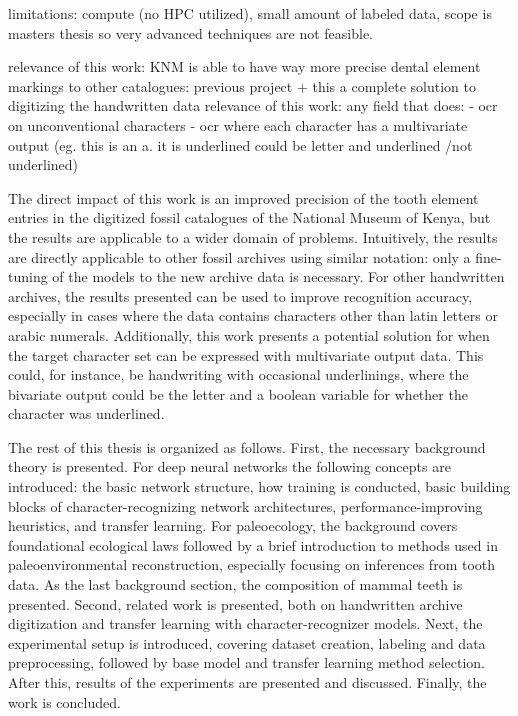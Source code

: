 \documentclass{article}
\begin{document}

limitations: compute (no HPC utilized), small amount of labeled data, scope is masters thesis so very advanced techniques are not feasible.

relevance of this work: KNM is able to have way more precise dental element markings
to other catalogues: previous project + this a complete solution to digitizing the handwritten data 
relevance of this work: any field that does:
- ocr on unconventional characters
- ocr where each character has a multivariate output (eg. this is an a. it is underlined could be letter and underlined /not underlined)

The direct impact of this work is an improved precision of the tooth element entries in the digitized 
fossil catalogues of the National Museum of Kenya, but the results are applicable to a wider domain of problems.
Intuitively, the results are directly applicable to other fossil archives using similar notation: only a fine-tuning of the 
models to the new archive data is necessary.
For other handwritten archives, the results presented can be used to improve recognition accuracy, especially in cases 
where the data contains characters other than latin letters or arabic numerals. Additionally, this work presents
a potential solution for when the target character set can be expressed with multivariate output data. This could, for 
instance, be handwriting with occasional underlinings, where the bivariate output could be the letter and a boolean variable for 
whether the character was underlined.

The rest of this thesis is organized as follows. First, the necessary background theory is 
presented. For deep neural networks the following concepts are introduced:
the basic network structure, how training is conducted, basic building blocks of character-recognizing network architectures, performance-improving 
heuristics, and transfer learning. For paleoecology, the background covers 
foundational ecological laws followed by a brief introduction to methods used in
paleoenvironmental reconstruction, especially focusing on inferences from tooth data.
As the last background section, the composition of mammal teeth is presented. 
Second, related work is presented, both on
handwritten archive digitization and transfer learning with character-recognizer models.
Next, the experimental setup is introduced, covering dataset creation, labeling and data 
preprocessing, followed by base model and transfer learning method selection. After this, 
results of the experiments are presented and discussed. Finally, the work is concluded.
\end{document}
